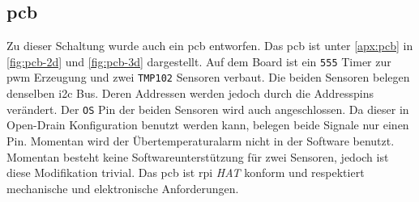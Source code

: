 \subsection{\acrshort{pcb}}

Zu dieser Schaltung wurde auch ein \gls{pcb} entworfen.
Das \gls{pcb} ist unter \autoref{apx:pcb} in \autoref{fig:pcb-2d} und \autoref{fig:pcb-3d} dargestellt.
Auf dem Board ist ein \texttt{555} Timer zur \gls{pwm} Erzeugung und zwei \texttt{TMP102} Sensoren verbaut.
Die beiden Sensoren belegen denselben \gls{i2c} Bus.
Deren Addressen werden jedoch durch die Addresspins verändert.
Der \texttt{OS} Pin der beiden Sensoren wird auch angeschlossen.
Da dieser in Open-Drain Konfiguration benutzt werden kann, belegen beide Signale nur einen Pin.
Momentan wird der Übertemperaturalarm nicht in der Software benutzt.
Momentan besteht keine Softwareunterstützung für zwei Sensoren, jedoch ist diese Modifikation trivial.
Das \gls{pcb} ist \gls{rpi} \textit{HAT} konform und respektiert mechanische und elektronische Anforderungen.
